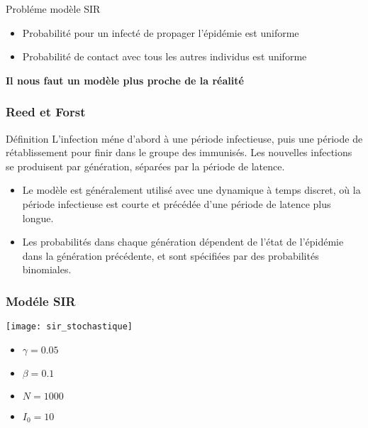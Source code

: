 \begin{frame}
    \begin{block}{Probléme modèle SIR}
        \begin{itemize}
            \item Probabilité pour un infecté de propager l'épidémie est uniforme
            \item Probabilité de contact avec tous les autres individus est uniforme
        \end{itemize}
    \end{block}

    \begin{center}
        \bf Il nous faut un modèle plus proche de la réalité
    \end{center}
\end{frame}


\begin{frame}
    \frametitle{Reed et Forst}

    \begin{block}{Définition}
        L'infection méne d'abord à une période infectieuse, puis une période de rétablissement pour finir dans le groupe des immunisés. Les nouvelles infections se produisent par génération, séparées par la période de latence.
    \end{block}

    \begin{itemize}
        \item Le modèle est généralement utilisé avec une dynamique à temps discret, où la période infectieuse est courte et précédée d’une période de latence plus longue.
        \item Les probabilités dans chaque génération dépendent de l’état de l’épidémie dans la génération précédente, et sont spécifiées par des probabilités binomiales.
    \end{itemize}
\end{frame}

\begin{frame}
        \frametitle{Modéle SIR}

        \centering
        \texttt{[image: sir\_stochastique]}

        \begin{multicols}{2}
            \begin{itemize}
                    \item $\gamma = 0.05$
                    \item $\beta = 0.1$
                    \item $N = 1000$
                    \item $I_0 = 10$
            \end{itemize}
        \end{multicols}

\end{frame}

